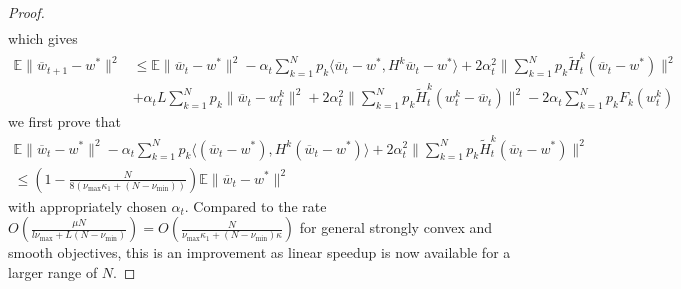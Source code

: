 \begin{proof}
\begin{align*}
	\end{align*}
	which gives 
	\begin{align*}
	\mathbb{E}\|\overline{w}_{t+1}-w^{\ast}\|^{2} & \leq\mathbb{E}\|\overline{w}_{t}-w^{\ast}\|^{2}-\alpha_{t}\sum_{k=1}^{N}p_{k}\langle\overline{w}_{t}-w^{\ast},H^{k}\overline{w}_{t}-w^{\ast}\rangle+2\alpha_{t}^{2}\|\sum_{k=1}^{N}p_{k}\tilde{H}_{t}^{k}(\overline{w}_{t}-w^{\ast})\|^{2}\\
	& +\alpha_{t}L\sum_{k=1}^{N}p_{k}\|\overline{w}_{t}-w_{t}^{k}\|^{2}+2\alpha_{t}^{2}\|\sum_{k=1}^{N}p_{k}\tilde{H}_{t}^{k}(w_{t}^{k}-\overline{w}_{t})\|^{2}-2\alpha_{t}\sum_{k=1}^{N}p_{k}F_{k}(w_{t}^{k})
	\end{align*}
	we first prove that 
	\begin{align*}
	\mathbb{E}\|\overline{w}_{t}-w^{\ast}\|^{2}-\alpha_{t}\sum_{k=1}^{N}p_{k}\langle(\overline{w}_{t}-w^{\ast}),H^{k}(\overline{w}_{t}-w^{\ast})\rangle+2\alpha_{t}^{2}\|\sum_{k=1}^{N}p_{k}\tilde{H}_{t}^{k}(\overline{w}_{t}-w^{\ast})\|^{2}\\
	\leq(1-\frac{N}{8(\nu_{\max}\kappa_{1}+(N-\nu_{\min}))})\mathbb{E}\|\overline{w}_{t}-w^{\ast}\|^{2}
	\end{align*}
	with appropriately chosen $\alpha_{t}$. Compared to the rate $O(\frac{\mu N}{l\nu_{\max}+L(N-\nu_{\min})})=O(\frac{N}{\nu_{\max}\kappa_{1}+(N-\nu_{\min})\kappa})$
	for general strongly convex and smooth objectives, this is an improvement
	as linear speedup is now available for a larger range of $N$. 
	

\end{proof}
